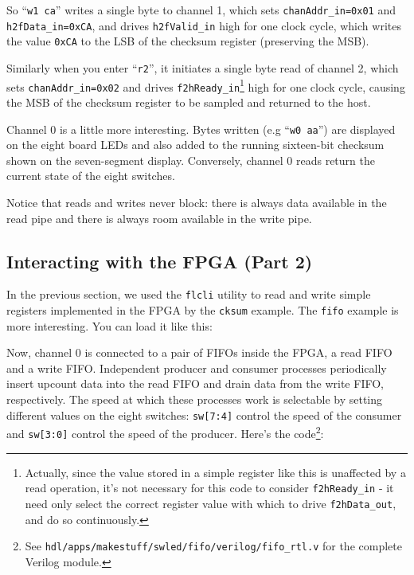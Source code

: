 
So ``\texttt{w1 ca}'' writes a single byte to channel 1, which sets \texttt{chanAddr\_in=0x01} and \texttt{h2fData\_in=0xCA}, and drives \texttt{h2fValid\_in} high for one clock cycle, which writes the value \texttt{0xCA} to the LSB of the checksum register (preserving the MSB).

Similarly when you enter ``\texttt{r2}'', it initiates a single byte read of channel 2, which sets \texttt{chanAddr\_in=0x02} and drives \texttt{f2hReady\_in}\footnote{Actually, since the value stored in a simple register like this is unaffected by a read operation, it's not necessary for this code to consider \texttt{f2hReady\_in} - it need only select the correct register value with which to drive \texttt{f2hData\_out}, and do so continuously.} high for one clock cycle, causing the MSB of the checksum register to be sampled and returned to the host.

Channel 0 is a little more interesting. Bytes written (e.g ``\texttt{w0 aa}'') are displayed on the eight board LEDs and also added to the running sixteen-bit checksum shown on the seven-segment display. Conversely, channel 0 reads return the current state of the eight switches.

Notice that reads and writes never block: there is always data available in the read pipe and there is always room available in the write pipe.

\subsection{Interacting with the FPGA (Part 2)}
In the previous section, we used the \texttt{flcli} utility to read and write simple registers implemented in the FPGA by the \texttt{cksum} example. The \texttt{fifo} example is more interesting. You can load it like this:


Now, channel 0 is connected to a pair of FIFOs inside the FPGA, a read FIFO and a write FIFO. Independent producer and consumer processes periodically insert upcount data into the read FIFO and drain data from the write FIFO, respectively. The speed at which these processes work is selectable by setting different values on the eight switches: \texttt{sw[7:4]} control the speed of the consumer and \texttt{sw[3:0]} control the speed of the producer.
\newpage
Here's the code\footnote{See \texttt{hdl/apps/makestuff/swled/fifo/verilog/fifo\_rtl.v} for the complete Verilog module.}:

